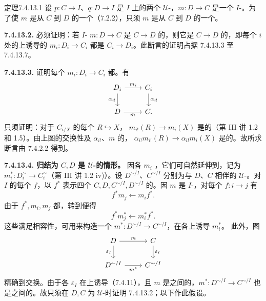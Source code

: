 \begin{SGAresult}{定理}{7.4.13.1}
设 $p:C\to I$、$q:D\to I$ 是 $I$ 上的两个 $\mathcal U$-，$m:D\to C$ 是一个 $I$-。为了使 $m$ 是从 $C$ 到 $D$ 的一个（7.2.2），只须 $m$ 是从 $C$ 到 $D$ 的一个。
\end{SGAresult}
\textbf{7.4.13.2.} 必须证明：若 $I$- $m:D\to C$ 是 $C\to D$ 的，则它是 $C\to D$ 的，即每个 $i$ 处的上诱导的 $m_i:D_i\to C_i$ 都是 $C_i\to D_i$。此断言的证明占据 7.4.13.3 至 7.4.13.7。

\textbf{7.4.13.3.} 证明每个 $m_i:D_i\to C_i$ 都。有
\[\begin{tikzcd}
D_i\arrow[r,"m_i"]\arrow[d,"\alpha_{i!}"']&C_i\arrow[d,"\alpha_{i!}"]\\
D\arrow[r,"m"']&C.
\end{tikzcd}\]
只须证明：对于 $C_{i/X}$ 的每个 $R\hookrightarrow X$， $m_{i!}(R)\to m_i(X)$ 是的（第 III 讲 1.2 和 1.5）。由上图的交换性及 $\alpha_{i!}$、$m$ 的， $\alpha_{i!}m_{i!}(R)\to\alpha_{i!}m_i(X)$ 是的。故所求断言由 7.4.2.2 得到。

\textbf{7.4.13.4. 归结为 $C,D$ 是 $\mathcal U$-的情形。} 因各 $m_i$ ，它们可自然延伸到，记为 $m_i^*:D_i^\sim\to C_i^\sim$（第 III 讲 1.2 iv)）。设 $D^{\sim/I}$、$C^{\sim/I}$ 分别为与 $D$、$C$ 相伴的 $\mathcal U$-。对 $I$ 的每个 $f$，以 $f^*$ 表示四个 $C,D,C^{\sim/I},D^{\sim/I}$ 的。因 $m$ 是 $I$-，对每个 $f:i\to j$ 有
\[f^*m_j\longleftarrow m_if^*.\]
由于 $f^*,m_i,m_j$ 都，转到便得
\[f^*m_j^*\longleftarrow m_i^*f^*.\]
这些满足相容性，可用来构造一个 $m^*:D^{\sim/I}\to C^{\sim/I}$，在各上诱导 $m_i^*$。
此外，图
\[\begin{tikzcd}
D\arrow[r,"m"]\arrow[d,"\varepsilon_I"']&C\arrow[d,"\varepsilon_I"]\\
D^{\sim/I}\arrow[r,"m^*"']&C^{\sim/I}
\end{tikzcd}\]
精确到交换。由于各 $\varepsilon_I$ 在上诱导（7.4.11），且 $m$ 是之间的，$m^*:D^{\sim/I}\to C^{\sim/I}$ 也是之间的。故只须在 $D,C$ 为 $\mathcal U$-时证明 7.4.13.2；以下作此假设。

